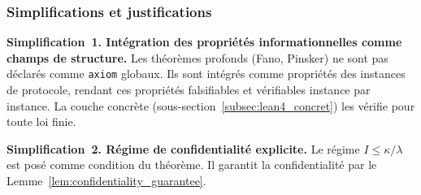 \begin{sloppypar}
\subsubsection{Simplifications et justifications}
\label{subsubsec:simplifications}

\textbf{Simplification~1. Int\'egration des propri\'et\'es informationnelles
comme champs de structure.} Les th\'eor\`emes profonds (Fano, Pinsker) ne sont pas
d\'eclar\'es comme \texttt{axiom} globaux. Ils sont
int\'egr\'es comme propri\'et\'es des instances de protocole, rendant ces
propri\'et\'es falsifiables et v\'erifiables instance par instance. La couche concr\`ete
(sous-section~\ref{subsec:lean4_concret}) les v\'erifie pour toute loi finie.

\textbf{Simplification~2. R\'egime de confidentialit\'e explicite.} Le r\'egime
$I \le \kappa/\lambda$ est pos\'e comme condition du
th\'eor\`eme. Il garantit la confidentialit\'e par le
Lemme~\ref{lem:confidentiality_guarantee}.
\end{sloppypar}

